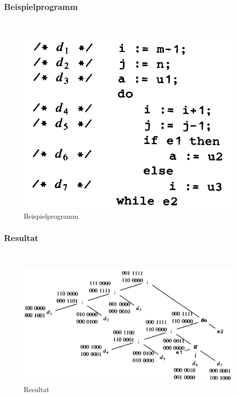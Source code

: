 \newpage
\subsubsection{Beispielprogramm} %
\label{ssub:beispielprogramm}
~\\
\begin{figure}[!ht]
    \centering
    \includegraphics[scale=0.2]{images/bild3-1.png}
    \caption{Beispielprogramm}
\end{figure}

\newpage

\subsubsection{Resultat} %
\label{ssub:resultat}
~\\
\begin{figure}[!ht]
    \centering
    \includegraphics[scale=0.2]{images/bild2-1.png}
    \caption{Resultat}
\end{figure}

